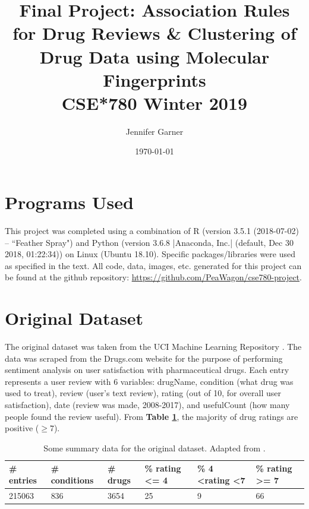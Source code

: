 \documentclass[11pt]{article}
\author{Jennifer Garner}
\date{\today}
\title{Final Project: Association Rules for Drug Reviews \& Clustering of Drug Data using Molecular Fingerprints \\ \small CSE*780 Winter 2019}
\begin{document}
\maketitle
\tableofcontents

\newpage
\section{Programs Used}

This project was completed using a combination of R (version 3.5.1 (2018-07-02) -- ``Feather Spray") and Python (version 3.6.8 |Anaconda, Inc.| (default, Dec 30 2018, 01:22:34)) on Linux (Ubuntu 18.10). Specific packages/libraries were used as specified in the text. All code, data, images, etc. generated for this project can be found at the github repository: \url{https://github.com/PeaWagon/cse780-project}.


\section{Original Dataset}

The original dataset was taken from the UCI Machine Learning Repository \cite{dataset-web}\cite{paper-analysis}. The data was scraped from the Drugs.com website for the purpose of performing sentiment analysis on user satisfaction with pharmaceutical drugs. Each entry represents a user review with 6 variables: drugName, condition (what drug was used to treat), review (user's text review), rating (out of 10, for overall user satisfaction), date (review was made, 2008-2017), and usefulCount (how many people found the review useful). From \textbf{Table \ref{orig-data}}, the majority of drug ratings are positive ($\geq 7$).

\begin{table}[H]
\centering
\begin{tabular}{llllll}
\toprule
\textbf{\# entries} & \textbf{\# conditions} & \textbf{\# drugs} & \textbf{\% rating \textless{}= 4} & \textbf{\% 4 \textless rating \textless 7} & \textbf{\% rating \textgreater{}= 7} \\
\midrule
215063              & 836                    & 3654              & 25                                & 9                                          & 66      \\
\bottomrule
\end{tabular}
\caption{Some summary data for the original dataset. Adapted from \cite{paper-analysis}.}
\label{orig-data}
\end{table}
\end{document}
